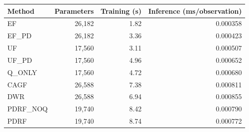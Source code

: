 \begin{tabular}{lrrr}
\toprule
Method & Parameters & Training (s) & Inference (ms/observation)\\
\midrule
EF & 26,182 & 1.82 & 0.000358\\
EF\_PD & 26,182 & 3.36 & 0.000423\\
UF & 17,560 & 3.11 & 0.000507\\
UF\_PD & 17,560 & 4.96 & 0.000652\\
Q\_ONLY & 17,560 & 4.72 & 0.000680\\
CAGF & 26,588 & 7.38 & 0.000811\\
DWR & 26,588 & 6.94 & 0.000855\\
PDRF\_NOQ & 19,740 & 8.42 & 0.000790\\
PDRF & 19,740 & 8.74 & 0.000772\\
\bottomrule
\end{tabular}
